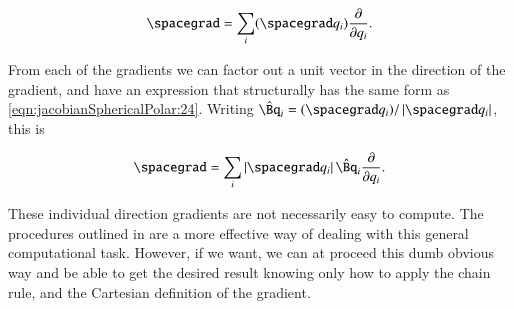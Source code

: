 \begin{align}\label{eqn:jacobianSphericalPolar:30}
\spacegrad = \sum_i (\spacegrad q_i) \PD{q_i}{}.
\end{align}

From each of the gradients we can factor out a unit vector in the direction of the gradient, and have an expression that structurally has the same form as \ref{eqn:jacobianSphericalPolar:24}.  Writing $\hat{\Bq}_i = (\spacegrad q_i)/\Abs{\spacegrad q_i}$, this is

\begin{align}\label{eqn:jacobianSphericalPolar:31}
\spacegrad = \sum_i \Abs{\spacegrad q_i} \hat{\Bq}_i \PD{q_i}{}.
\end{align}

These individual direction gradients are not necessarily easy to compute.  The procedures outlined in \citep{byron1992mca} are a more effective way of dealing with this general computational task.  However, if we want, we can at proceed this dumb obvious way and be able to get the desired result knowing only how to apply the chain rule, and the Cartesian definition of the gradient.

\EndArticle
